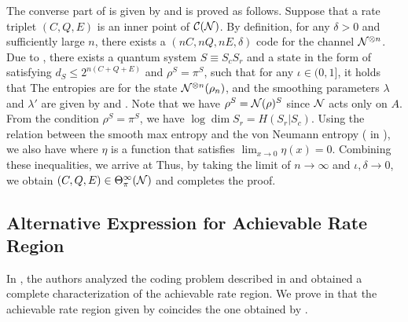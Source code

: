 \documentclass[journal]{IEEEtran}
\begin{document}
The converse part of  is given by
and is proved as follows.
Suppose that a rate triplet $(C,Q,E)$ is an inner point of ${\mathcal C}({\mathcal N})$.
By definition, for any $\delta>0$ and sufficiently large $n$, there exists a $(nC,nQ,nE,\delta)$ code for the channel ${\mathcal N}^{\otimes n}$.
Due to , there exists a quantum system $S\equiv S_cS_r$ and a state in the form of
 satisfying $d_{S}\leq2^{n(C+Q+E)}$ and $\rho^{S}=\pi^{S}$,
such that for any $\iota\in(0,1]$, it holds that
The entropies are for the state ${\mathcal N}^{\otimes n}(\rho_n)$, and the smoothing parameters $\lambda$ and $\lambda'$ are given by  and .
Note that we have $\rho^{S}={\mathcal N}(\rho)^{S}$ since ${\mathcal N}$ acts only on $A$.
From the condition $\rho^{S}=\pi^{S}$, we have $\log{\dim{S_r}}=H(S_r|S_c)$.
Using the relation between the smooth max entropy and the von Neumann entropy ( in ), we also have
where $\eta$ is a function that satisfies $\lim_{x\rightarrow0}\eta(x)=0$.
Combining these inequalities, we arrive at
Thus, by taking the limit of $n\rightarrow\infty$ and $\iota,\delta\rightarrow0$, we obtain $(C,Q,E)\in{\Theta_{\pi}^{\infty}({\mathcal N})}$ and completes the proof. 
\QED


\subsection{Alternative Expression for Achievable Rate Region}

In \cite{hsieh2010entanglement}, the authors analyzed the coding problem described in  and obtained a complete characterization of the achievable rate region. 
We prove in  that the achievable rate region given by  coincides the one obtained by \cite{hsieh2010entanglement}.
\end{document}
